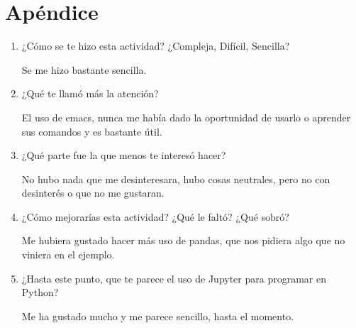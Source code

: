 \documentclass[a4paper]{article}
\begin{document}
\section{Apéndice}

\begin{enumerate}
\item ¿Cómo se te hizo esta actividad? ¿Compleja, Difícil, Sencilla?

Se me hizo bastante sencilla.

\item ¿Qué te llamó más la atención?

El uso de emacs, nunca me había dado la oportunidad de usarlo o aprender sus comandos y es bastante útil.

\item ¿Qué parte fue la que menos te interesó hacer?

No hubo nada que me desinteresara, hubo cosas neutrales, pero no con desinterés o que no me gustaran.

\item ¿Cómo mejorarías esta actividad? ¿Qué le faltó? ¿Qué sobró?

Me hubiera gustado hacer más uso de pandas, que nos pidiera algo que no viniera en el ejemplo.

\item ¿Hasta este punto, que te parece el uso de Jupyter para programar en Python? 

Me ha gustado mucho y me parece sencillo, hasta el momento.

\end{enumerate}
\end{document}
